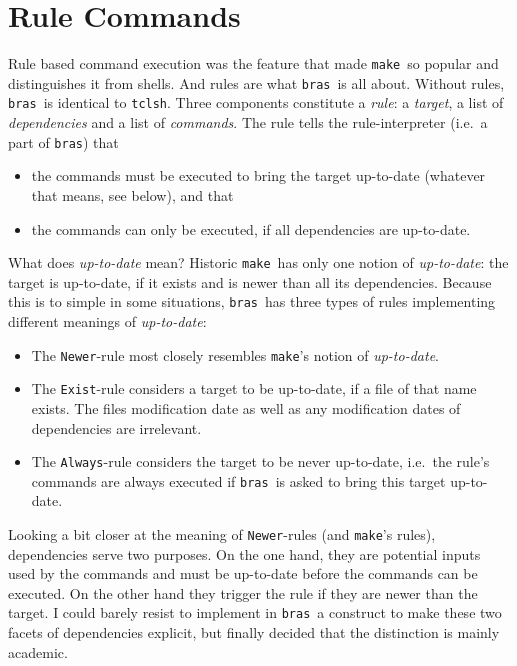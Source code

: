 \documentclass[12pt]{article}
\newcommand{\bras}{\texttt{bras}}
\newcommand{\make}{\texttt{make}}
\begin{document}
\section{Rule Commands}

Rule based command execution was the feature that made \make\ so
popular and distinguishes it from shells. And rules are what
\bras\ is all about. Without rules, \bras\ is identical to
\texttt{tclsh}. Three components constitute a \textit{rule}: a
\textit{target}, a list of \textit{dependencies} and a list of
\textit{commands}. The rule tells the rule-interpreter (i.e.\ a part
of \bras) that
\begin{itemize}
\item the commands must be executed to bring the target up-to-date
(whatever that means, see below), and that
\item the commands can only be executed, if all dependencies are
up-to-date.
\end{itemize}

What does \textit{up-to-date} mean? Historic \make\ has only one
notion of \textit{up-to-date}: the target is up-to-date, if it exists
and is newer than all its dependencies. Because this is to simple in
some situations, \bras\
has three types of rules implementing different
meanings of \textit{up-to-date}:

\begin{itemize}
\item The \texttt{Newer}-rule most closely resembles \make's notion of
\textit{up-to-date}.
\item The \texttt{Exist}-rule considers a target to be up-to-date,
if a file of that name exists. The files modification date as well as
any modification dates of dependencies are irrelevant.
\item The \texttt{Always}-rule considers the target to be never
up-to-date, i.e.\ the rule's commands are always executed if
\bras\ is asked to bring this target up-to-date.
\end{itemize}

Looking a bit closer at the meaning of \texttt{Newer}-rules (and
\make's rules),
dependencies serve two purposes. On the one hand, they are potential
inputs used by the commands and must be up-to-date before the commands
can be executed. On the other hand they trigger the rule if they are
newer than the target. I could barely resist to implement in \bras\ a
construct to make these two facets of dependencies explicit, but
finally decided that the distinction is mainly academic.
\end{document}
